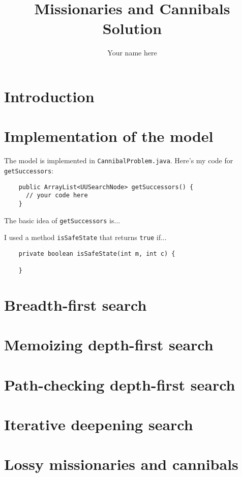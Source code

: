 \documentclass{article}
\title{Missionaries and Cannibals Solution}
\author{Your name here}
\begin{document}
\maketitle

\section{Introduction}

\section{Implementation of the model}

The model is implemented in 
\verb`CannibalProblem.java`.  Here's my code for \verb`getSuccessors`:


\begin{lstlisting}
    public ArrayList<UUSearchNode> getSuccessors() {
      // your code here
    }
\end{lstlisting}

The basic idea of \verb`getSuccessors` is...

I used a method \verb`isSafeState` that returns \verb`true` if...

\begin{lstlisting}
    private boolean isSafeState(int m, int c) {
  
    }

\end{lstlisting}

\section{Breadth-first search}


\section{Memoizing depth-first search}

\section{Path-checking depth-first search}

\section{Iterative deepening search}



\section{Lossy missionaries and cannibals}
\end{document}
